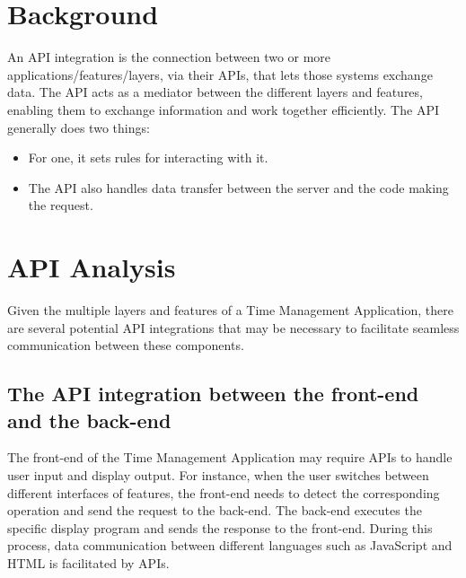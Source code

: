 \documentclass[peerreview]{IEEEtran}
\begin{document}
\section{Background}
  An API integration is the connection between two or more applications/features/layers, via their APIs, that lets those systems exchange data. The API acts as a mediator between the different layers and features, enabling them to exchange information and work together efficiently. The API generally does two things:
  \begin{itemize}
    \item For one, it sets rules for interacting with it. 
    \item The API also handles data transfer between the server and the code making the request.
  \end{itemize}


\section{API Analysis}
Given the multiple layers and features of a Time Management Application, there are several potential API integrations that may be necessary to facilitate seamless communication between these components.
\subsection{The API integration between the front-end and the back-end}
The front-end of the Time Management Application may require APIs to handle user input and display output. For instance, when the user switches between different interfaces of features, the front-end needs to detect the corresponding operation and send the request to the back-end. The back-end executes the specific display program and sends the response to the front-end. During this process, data communication between different languages such as JavaScript and HTML is facilitated by APIs. 
\end{document}
